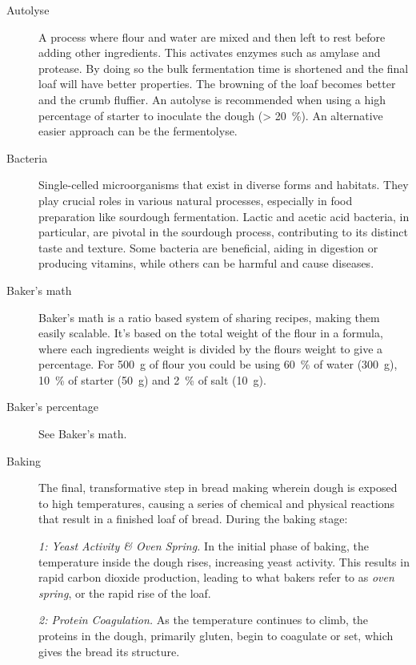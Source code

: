 \begin{description}
\item[Autolyse] A process where flour and water are mixed and then left to rest
before adding other ingredients. This activates enzymes such as amylase and protease.
By doing so the bulk fermentation time is shortened and the final loaf will have
better properties. The browning of the loaf becomes better and the crumb fluffier.
An autolyse is recommended when using a high percentage of starter to inoculate the
dough (> \SI{20}{\percent}). An alternative easier approach can be the fermentolyse.

\item[Bacteria] Single-celled microorganisms that exist in diverse forms and
habitats. They play crucial roles in various natural processes, especially in food
preparation like sourdough fermentation. Lactic and acetic acid bacteria, in particular,
are pivotal in the sourdough process, contributing to its distinct taste and texture.
Some bacteria are beneficial, aiding in digestion or producing vitamins, while others
can be harmful and cause diseases.

\item[Baker’s math] Baker’s math is a ratio based system of sharing recipes,
making them easily scalable. It’s based on the total weight of the flour in a formula,
where each ingredients weight is divided by the flours weight to give a percentage.
For \SI{500}{\gram} of flour you could be using \SI{60}{\percent} of water (\SI{300}{\gram}),
\SI{10}{\percent} of starter (\SI{50}{\gram}) and \SI{2}{\percent} of salt (\SI{10}{\gram}).

\item[Baker’s percentage] See Baker’s math.

\item[Baking] The final, transformative step in bread making wherein dough is
exposed to high temperatures, causing a series of chemical and physical reactions
that result in a finished loaf of bread. During the baking stage:

\emph{1: Yeast Activity \& Oven Spring.} In the initial phase of baking, the
temperature inside the dough rises, increasing yeast activity. This results in rapid
carbon dioxide production, leading to what bakers refer to as \emph{oven spring}, or the
rapid rise of the loaf.

\emph{2: Protein Coagulation.}  As the temperature continues to climb, the proteins
in the dough, primarily gluten, begin to coagulate or set, which gives the bread its
structure.


\end{description}
